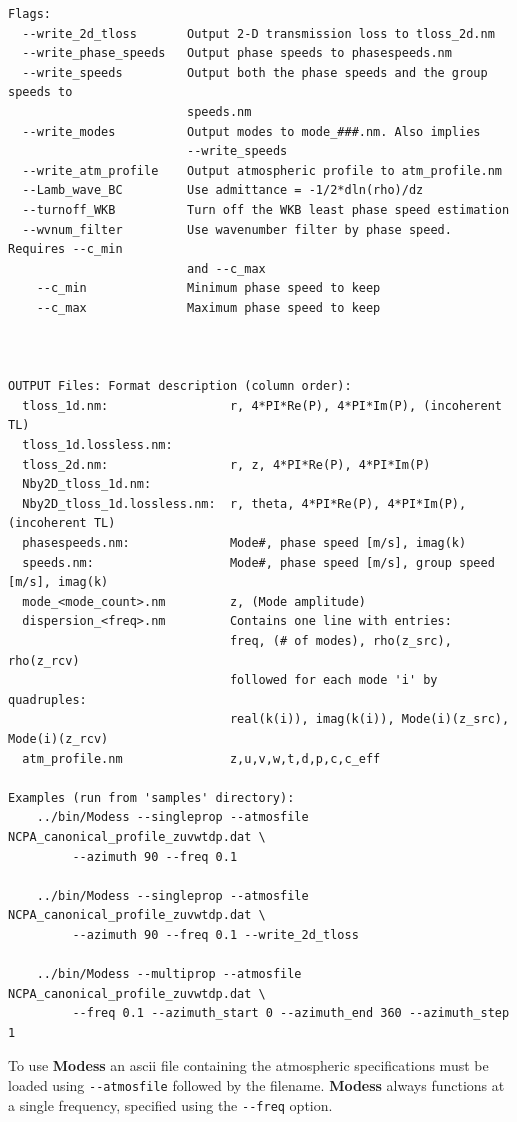 \begin{verbatim}
Flags:
  --write_2d_tloss       Output 2-D transmission loss to tloss_2d.nm
  --write_phase_speeds   Output phase speeds to phasespeeds.nm
  --write_speeds         Output both the phase speeds and the group speeds to
                         speeds.nm
  --write_modes          Output modes to mode_###.nm. Also implies
                         --write_speeds
  --write_atm_profile    Output atmospheric profile to atm_profile.nm
  --Lamb_wave_BC         Use admittance = -1/2*dln(rho)/dz
  --turnoff_WKB          Turn off the WKB least phase speed estimation
  --wvnum_filter         Use wavenumber filter by phase speed. Requires --c_min
                         and --c_max
    --c_min              Minimum phase speed to keep
    --c_max              Maximum phase speed to keep



OUTPUT Files: Format description (column order):
  tloss_1d.nm:                 r, 4*PI*Re(P), 4*PI*Im(P), (incoherent TL)
  tloss_1d.lossless.nm:
  tloss_2d.nm:                 r, z, 4*PI*Re(P), 4*PI*Im(P)
  Nby2D_tloss_1d.nm:
  Nby2D_tloss_1d.lossless.nm:  r, theta, 4*PI*Re(P), 4*PI*Im(P), (incoherent TL)
  phasespeeds.nm:              Mode#, phase speed [m/s], imag(k)
  speeds.nm:                   Mode#, phase speed [m/s], group speed [m/s], imag(k)
  mode_<mode_count>.nm         z, (Mode amplitude)
  dispersion_<freq>.nm         Contains one line with entries:
                               freq, (# of modes), rho(z_src), rho(z_rcv)
                               followed for each mode 'i' by quadruples:
                               real(k(i)), imag(k(i)), Mode(i)(z_src), Mode(i)(z_rcv)
  atm_profile.nm               z,u,v,w,t,d,p,c,c_eff

Examples (run from 'samples' directory):
    ../bin/Modess --singleprop --atmosfile NCPA_canonical_profile_zuvwtdp.dat \
         --azimuth 90 --freq 0.1

    ../bin/Modess --singleprop --atmosfile NCPA_canonical_profile_zuvwtdp.dat \
         --azimuth 90 --freq 0.1 --write_2d_tloss

    ../bin/Modess --multiprop --atmosfile NCPA_canonical_profile_zuvwtdp.dat \
         --freq 0.1 --azimuth_start 0 --azimuth_end 360 --azimuth_step 1

\end{verbatim}

To use {\bf Modess} an ascii file containing the atmospheric specifications must be loaded using \verb+--atmosfile+ followed by the filename. {\bf Modess} always functions at a single frequency, specified using the \verb+--freq+ option. 

